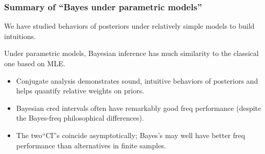 \documentclass[18pt]{beamer}
\newenvironment{narrowItemize}[1][]{%
  \vspace{-.3\baselineskip}%
  \begin{itemize}[#1]
  \addtolength\itemsep{-.1\baselineskip}
}{
  \end{itemize}
}
\begin{document}
\begin{frame}
\frametitle{Summary of ``Bayes under parametric models''}
We have studied behaviors of posteriors under relatively simple models to build intuitions. 

\pause%
Under parametric models, Bayesian inference has much similarity to the classical one based on {\small MLE}.
\pause%
\begin{narrowItemize}[<+->]
\item Conjugate analysis demonstrates sound, intuitive behaviors of posteriors and helps quantify relative weights on priors. 
\item Bayesian cred intervals often have remarkably good freq performance (despite the Bayes-freq philosophical differences).
\item The two``CI''s coincide asymptotically; 
	Bayes's may well have better freq performance than alternatives in finite samples.
\end{narrowItemize}
\end{frame}
\end{document}
